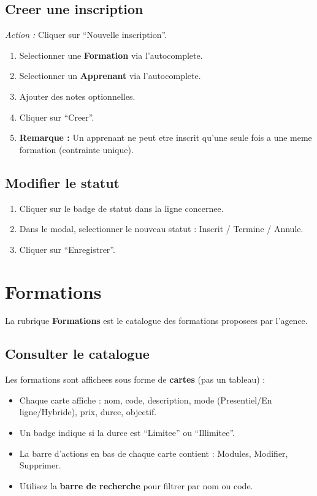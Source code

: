 \documentclass[a4paper,11pt]{article}
\newcommand{\etape}[1]{\textcolor{step}{\textbf{\'Etape :} #1}}
\newcommand{\action}[1]{\textcolor{brand}{\textit{Action :} #1}}
\newcommand{\remarque}[1]{\textcolor{warn}{\textbf{Remarque :} #1}}
\begin{document}
\subsection{Creer une inscription}
\action{Cliquer sur ``Nouvelle inscription''.}
\begin{enumerate}[label=\etape{\arabic*}]
  \item Selectionner une \textbf{Formation} via l'autocomplete.
  \item Selectionner un \textbf{Apprenant} via l'autocomplete.
  \item Ajouter des notes optionnelles.
  \item Cliquer sur ``Creer''.
  \item \remarque{Un apprenant ne peut etre inscrit qu'une seule fois a une meme formation (contrainte unique).}
\end{enumerate}

\subsection{Modifier le statut}
\begin{enumerate}[label=\etape{\arabic*}]
  \item Cliquer sur le badge de statut dans la ligne concernee.
  \item Dans le modal, selectionner le nouveau statut : Inscrit / Termine / Annule.
  \item Cliquer sur ``Enregistrer''.
\end{enumerate}


\section{Formations}

La rubrique \textbf{Formations} est le catalogue des formations proposees par l'agence.

\subsection{Consulter le catalogue}
Les formations sont affichees sous forme de \textbf{cartes} (pas un tableau) :
\begin{itemize}
  \item Chaque carte affiche : nom, code, description, mode (Presentiel/En ligne/Hybride), prix, duree, objectif.
  \item Un badge indique si la duree est ``Limitee'' ou ``Illimitee''.
  \item La barre d'actions en bas de chaque carte contient : Modules, Modifier, Supprimer.
  \item Utilisez la \textbf{barre de recherche} pour filtrer par nom ou code.
\end{itemize}
\end{document}

